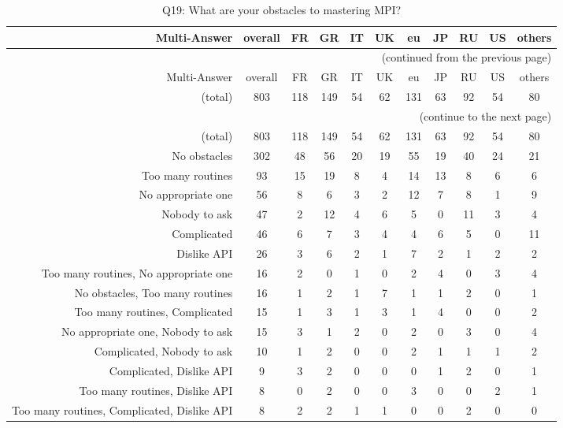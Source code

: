 \clearpage%
{\footnotesize\begin{landscape}%
\begin{longtable}[htb]{r|c|c|c|c|c|c|c|c|c|c}%
\caption{Q19: What are your obstacles to mastering MPI?}%
\label{tab:Q19-mans} \\%
\hline%
Multi-Answer & overall & FR & GR & IT & UK & eu & JP & RU & US & others \\
 \hline%
\endfirsthead%
\multicolumn{11}{r}{(continued from the previous page)}\\%
\hline%
Multi-Answer & overall & FR & GR & IT & UK & eu & JP & RU & US & others \\
 \hline%
\endhead%
\hline%
(total) & 803 & 118 & 149 & 54 & 62 & 131 & 63 & 92 & 54 & 80 \\%
\hline%
\multicolumn{11}{r}{(continue to the next page)}\\%
\endfoot%
\hline%
(total) & 803 & 118 & 149 & 54 & 62 & 131 & 63 & 92 & 54 & 80 \\%
\hline%
\endlastfoot%
\hline%
{No obstacles} & 302 & 48 & 56 & 20 & 19 & 55 & 19 & 40 & 24 & 21 \\%
{Too many routines} & 93 & 15 & 19 & 8 & 4 & 14 & 13 & 8 & 6 & 6 \\%
{No appropriate one} & 56 & 8 & 6 & 3 & 2 & 12 & 7 & 8 & 1 & 9 \\%
{Nobody to ask} & 47 & 2 & 12 & 4 & 6 & 5 & 0 & 11 & 3 & 4 \\%
{Complicated} & 46 & 6 & 7 & 3 & 4 & 4 & 6 & 5 & 0 & 11 \\%
{Dislike API} & 26 & 3 & 6 & 2 & 1 & 7 & 2 & 1 & 2 & 2 \\%
{Too many routines, No appropriate one} & 16 & 2 & 0 & 1 & 0 & 2 & 4 & 0 & 3 & 4 \\%
{No obstacles, Too many routines} & 16 & 1 & 2 & 1 & 7 & 1 & 1 & 2 & 0 & 1 \\%
{Too many routines, Complicated} & 15 & 1 & 3 & 1 & 3 & 1 & 4 & 0 & 0 & 2 \\%
{No appropriate one, Nobody to ask} & 15 & 3 & 1 & 2 & 0 & 2 & 0 & 3 & 0 & 4 \\%
{Complicated, Nobody to ask} & 10 & 1 & 2 & 0 & 0 & 2 & 1 & 1 & 1 & 2 \\%
{Complicated, Dislike API} & 9 & 3 & 2 & 0 & 0 & 0 & 1 & 2 & 0 & 1 \\%
{Too many routines, Dislike API} & 8 & 0 & 2 & 0 & 0 & 3 & 0 & 0 & 2 & 1 \\%
{Too many routines, Complicated, Dislike API} & 8 & 2 & 2 & 1 & 1 & 0 & 0 & 2 & 0 & 0 \\%

\end{longtable}
\end{landscape}}
